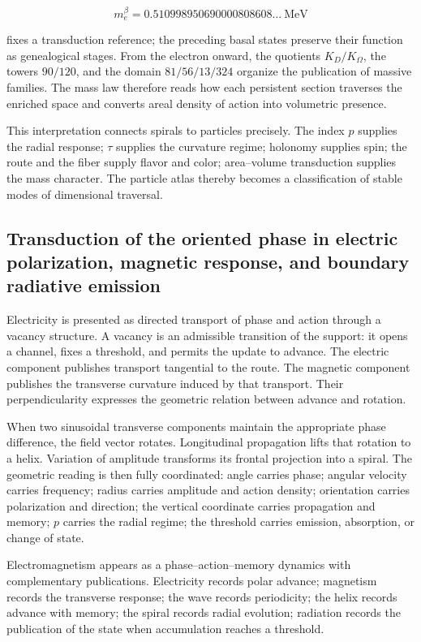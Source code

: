 \[
m_e^\beta=0.510998950690000808608\ldots\ \mathrm{MeV}
\]

fixes a transduction reference; the preceding basal states preserve their function as genealogical stages. From the electron onward, the quotients \(K_D/K_\Omega\), the towers \(90/120\), and the domain \(81/56/13/324\) organize the publication of massive families. The mass law therefore reads how each persistent section traverses the enriched space and converts areal density of action into volumetric presence.

This interpretation connects spirals to particles precisely. The index \(p\) supplies the radial response; \(\tau\) supplies the curvature regime; holonomy supplies spin; the route and the fiber supply flavor and color; area--volume transduction supplies the mass character. The particle atlas thereby becomes a classification of stable modes of dimensional traversal.

\subsection{Transduction of the oriented phase in electric polarization, magnetic response, and boundary radiative emission}

Electricity is presented as directed transport of phase and action through a vacancy structure. A vacancy is an admissible transition of the support: it opens a channel, fixes a threshold, and permits the update to advance. The electric component publishes transport tangential to the route. The magnetic component publishes the transverse curvature induced by that transport. Their perpendicularity expresses the geometric relation between advance and rotation.

When two sinusoidal transverse components maintain the appropriate phase difference, the field vector rotates. Longitudinal propagation lifts that rotation to a helix. Variation of amplitude transforms its frontal projection into a spiral. The geometric reading is then fully coordinated: angle carries phase; angular velocity carries frequency; radius carries amplitude and action density; orientation carries polarization and direction; the vertical coordinate carries propagation and memory; \(p\) carries the radial regime; the threshold carries emission, absorption, or change of state.

Electromagnetism appears as a phase–action–memory dynamics with complementary publications. Electricity records polar advance; magnetism records the transverse response; the wave records periodicity; the helix records advance with memory; the spiral records radial evolution; radiation records the publication of the state when accumulation reaches a threshold.

